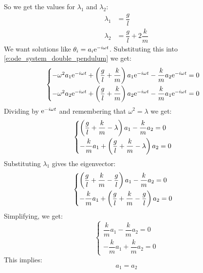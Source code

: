 So we get the values for $\lambda_1$ and $\lambda_2$:
\begin{equation}
    \begin{split}
        \lambda_1 &= \dfrac{g}{l}\\
        \lambda_2 &= \dfrac{g}{l} + 2\dfrac{k}{m}
    \end{split}
\end{equation}
We want solutions like $\theta_i = a_i\mathrm{e}^{-i\omega t}$. Substituting this into \eqref{e:ode_system_double_pendulum} we get:
\begin{equation}
    \begin{cases}
        -\omega^2 a_1 \mathrm{e}^{-i\omega t} + \left(\dfrac{g}{l} + \dfrac{k}{m}\right) a_1 \mathrm{e}^{-i\omega t} - \dfrac{k}{m} a_2 \mathrm{e}^{-i\omega t} = 0\\[8pt]
        -\omega^2 a_2 \mathrm{e}^{-i\omega t} + \left(\dfrac{g}{l} + \dfrac{k}{m}\right) a_2 \mathrm{e}^{-i\omega t} - \dfrac{k}{m} a_1 \mathrm{e}^{-i\omega t} = 0
    \end{cases}
\end{equation}
Dividing by $\mathrm{e}^{-i\omega t}$ and remembering that $\omega^2 = \lambda$ we get:
\begin{equation}
    \begin{cases}
        \left(\dfrac{g}{l} + \dfrac{k}{m} - \lambda\right) a_1 - \dfrac{k}{m} a_2 = 0\\[8pt]
        -\dfrac{k}{m} a_1 + \left(\dfrac{g}{l} + \dfrac{k}{m} - \lambda\right) a_2 = 0
    \end{cases}
\end{equation}
Substituting $\lambda_1$ gives the eigenvector:
\begin{equation}
    \begin{cases}
        \left(\dfrac{g}{l} + \dfrac{k}{m} - \dfrac{g}{l}\right) a_1 - \dfrac{k}{m} a_2 = 0\\[8pt]
        -\dfrac{k}{m} a_1 + \left(\dfrac{g}{l} + \dfrac{k}{m} - \dfrac{g}{l}\right) a_2 = 0
    \end{cases}
\end{equation}
Simplifying, we get:
\begin{equation}
    \begin{cases}
        \dfrac{k}{m} a_1 - \dfrac{k}{m} a_2 = 0\\[8pt]
        -\dfrac{k}{m} a_1 + \dfrac{k}{m} a_2 = 0
    \end{cases}
\end{equation}
This implies:
\begin{equation}
    a_1 = a_2
\end{equation}
